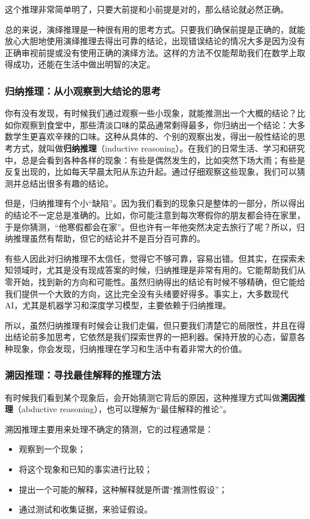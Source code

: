这个推理非常简单明了，只要大前提和小前提是对的，那么结论就必然正确。

总的来说，演绎推理是一种很有用的思考方式。只要我们确保前提是正确的，就能放心大胆地使用演绎推理去得出可靠的结论，出现错误结论的情况大多是因为没有正确审视前提或没有使用正确的演绎方法。这样的方法不仅能帮助我们在数学上取得成功，还能在生活中做出明智的决定。

\subsubsection{归纳推理：从小观察到大结论的思考}

你有没有发现，有时候我们通过观察一些小现象，就能推测出一个大概的结论？比如你观察到食堂中，那些清淡口味的菜品通常剩得最多，你归纳出一个结论：大多数学生更喜欢辛辣的口味。这种从具体的、个别的观察出发，得出一般性结论的思考方式，就叫做\textbf{归纳推理}（inductive reasoning）。在我们的日常生活、学习和研究中，总是会看到各种各样的现象：有些是偶然发生的，比如突然下场大雨；有些是反复出现的，比如每天早晨太阳从东边升起。通过仔细观察这些现象，我们可以猜测并总结出很多有趣的结论。

但是，归纳推理有个小“缺陷”。因为我们看到的现象只是整体的一部分，所以得出的结论不一定总是准确的。比如，你可能注意到每次寒假你的朋友都会待在家里，于是你猜测，“他寒假都会在家”。但也许有一年他突然决定去旅行了呢？所以，归纳推理虽然有帮助，但它的结论并不是百分百可靠的。

有些人因此对归纳推理不太信任，觉得它不够可靠，容易出错。但其实，在探索未知领域时，尤其是没有现成答案的时候，归纳推理是非常有用的。它能帮助我们从零开始，找到新的方向和可能性。虽然归纳得出的结论有时候不够精确，但它能给我们提供一个大致的方向，这比完全没有头绪要好得多。事实上，大多数现代AI，尤其是机器学习和深度学习模型，主要依赖于归纳推理。

所以，虽然归纳推理有时候会让我们走偏，但只要我们清楚它的局限性，并且在得出结论前多加思考，它依然是我们探索世界的一把利器。保持开放的心态，留意各种现象，你会发现，归纳推理在学习和生活中有着非常大的价值。

\subsubsection{溯因推理：寻找最佳解释的推理方法}

有时候我们看到某个现象后，会开始猜测它背后的原因，这种推理方式叫做\textbf{溯因推理}（abductive reasoning），也可以理解为“最佳解释的推论”。

溯因推理主要用来处理不确定的猜测，它的过程通常是：
\begin{itemize}
\item 观察到一个现象；
\item 将这个现象和已知的事实进行比较；
\item 提出一个可能的解释，这种解释就是所谓“推测性假设”；
\item 通过测试和收集证据，来验证假设。
\end{itemize}

